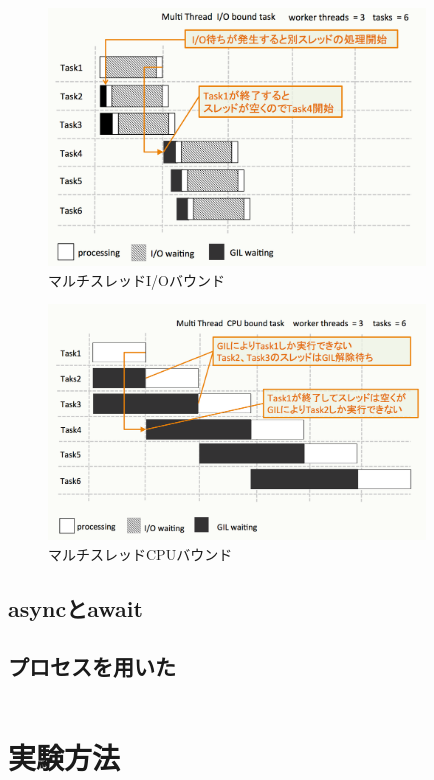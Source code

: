 \documentclass[14pt, oneside]{article}     	%
\begin{document}
\begin{figure}[h]
  \centering
  \includegraphics[width=10cm]{multithred_iobound.png}
  \caption{マルチスレッドI/Oバウンド}
  \label{multithred_iobound}
\end{figure}

\begin{figure}[h]
  \centering
  \includegraphics[width=10cm]{multithred_cpubound.png}
  \caption{マルチスレッドCPUバウンド}
  \label{multithred_cpubound}
\end{figure}



\subsection{asyncとawait}


\subsection{プロセスを用いた}

\begin{lstlisting}[caption=シンプレクス法プログラム]

\end{lstlisting}

\section{実験方法}
\end{document}
